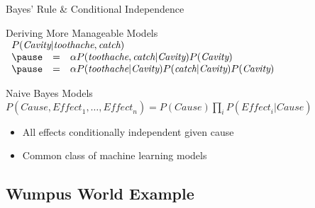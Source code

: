 \documentclass[14pt]{beamer}
\begin{document}
\begin{frame}{Bayes' Rule \& Conditional Independence}
	\begin{block}{Deriving More Manageable Models}
		$
		\begin{array}{lll}
		\lefteqn{P(\textit{Cavity}|\textit{toothache}, \textit{catch})} \\
		\pause
		& = & \alpha\displaystyle P(\textit{toothache}, \textit{catch}|\textit{Cavity})
		                          P(\textit{Cavity}) \\
		\pause
		& = & \alpha\displaystyle P(\textit{toothache}|\textit{Cavity})
		                          P(\textit{catch}|\textit{Cavity})
		                          P(\textit{Cavity}) \\
		\end{array}
		$
	\end{block}
	\pause
	\begin{block}{Naive Bayes Models}
		\small
		$
		P(\textit{Cause},\textit{Effect}_{1},\ldots,\textit{Effect}_{n})
		 = P(\textit{Cause})\prod_{i}{P(\textit{Effect}_{i}|\textit{Cause})}
		$
		\normalsize
		\begin{itemize}
			\item All effects conditionally independent given cause
			\item Common class of machine learning models
		\end{itemize}
	\end{block}
\end{frame}

\subsection{Wumpus World Example}
\end{document}
